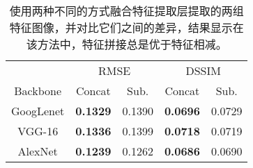 \begin{table}[t]
    \centering
    \caption[特征融合方式对光照估计的影响]{
    \label{table:fusion-method}
    使用两种不同的方式融合特征提取层提取的两组特征图像，并对比它们之间的差异，结果显示在该方法中，特征拼接总是优于特征相减。
    }
    \begin{tabular}{c|cc|cc} 
     \hline
        ~&\multicolumn{2}{c|}{RMSE}&\multicolumn{2}{c}{DSSIM}\\
        Backbone & Concat & Sub. & Concat &Sub.\\
    \hline
    GoogLenet & \textbf{0.1329} & 0.1390 & \textbf{0.0696} & 0.0729 \\ \hline
    VGG-16    & \textbf{0.1336} & 0.1399 & \textbf{0.0718} & 0.0719 \\ \hline
    AlexNet   & \textbf{0.1239} & 0.1262 & \textbf{0.0686} & 0.0690 \\ \hline
    \end{tabular}
\end{table}

